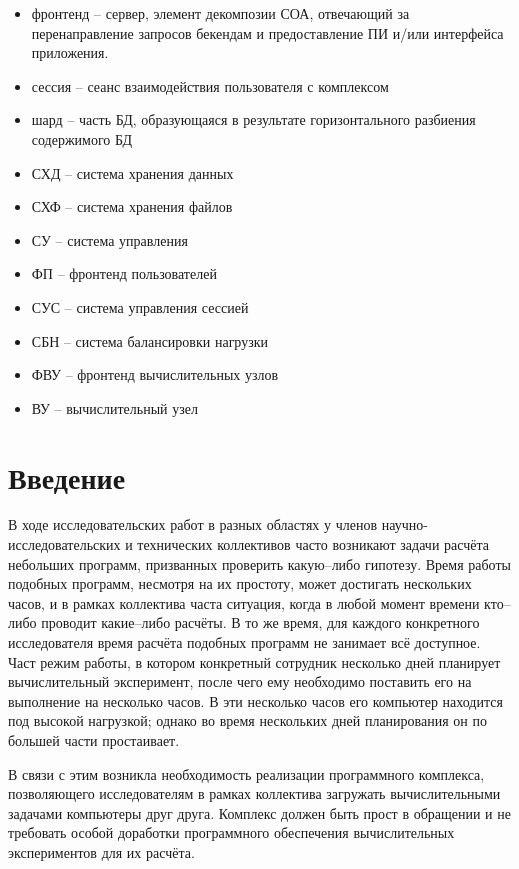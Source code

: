 \documentclass[a4paper,12pt]{report}
\numberwithin{equation}{section}
\begin{document}
\begin{itemize}
    \item фронтенд -- сервер, элемент декомпозии СОА, отвечающий за перенаправление запросов бекендам и предоставление ПИ и/или интерфейса приложения.
    \item сессия -- сеанс взаимодействия пользователя с комплексом
    \item шард -- часть БД, образующаяся в результате горизонтального разбиения содержимого БД
    \item СХД -- система хранения данных
    \item СХФ -- система хранения файлов
    \item СУ -- система управления
    \item ФП -- фронтенд пользователей
    \item СУС -- система управления сессией
    \item СБН -- система балансировки нагрузки
    \item ФВУ -- фронтенд вычислительных узлов
    \item ВУ -- вычислительный узел
  \end{itemize}
  
  \clearpage
  \section{Введение}
  
  В ходе исследовательских работ в разных областях у членов научно-исследовательских и технических коллективов часто возникают задачи расчёта небольших программ, призванных проверить какую--либо гипотезу. 
  Время работы подобных программ, несмотря на их простоту, может достигать нескольких часов, и в рамках коллектива часта ситуация, когда в любой момент времени кто--либо проводит какие--либо расчёты. 
  В то же время, для каждого конкретного исследователя время расчёта подобных программ не занимает всё доступное. 
  Част режим работы, в котором конкретный сотрудник несколько дней планирует вычислительный эксперимент, после чего ему необходимо поставить его на выполнение на несколько часов. 
  В эти несколько часов его компьютер находится под высокой нагрузкой; однако во время нескольких дней планирования он по большей части простаивает.
  
  В связи с этим возникла необходимость реализации программного комплекса, позволяющего исследователям в рамках коллектива загружать вычислительными задачами компьютеры друг друга.
  Комплекс должен быть прост в обращении и не требовать особой доработки программного обеспечения вычислительных экспериментов для их расчёта.
  
\end{document}
